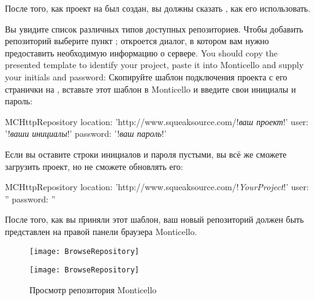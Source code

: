 \documentclass[a4paper,10pt,twoside]{book}
\begin{document}
{%
После того, как проект на \sqsrc был создан, вы должны сказать \pharo, как его использовать.

 Вы увидите список различных типов доступных репозиториев. Чтобы добавить репозиторий \sqsrc выберите пункт ; откроется диалог, в котором вам нужно предоставить необходимую информацию о сервере.
You should copy the presented template to identify your \sqsrc project, paste it into Monticello and supply your initials and password:
Скопируйте шаблон подключения проекта с его странички на \sqsrc, вставьте этот шаблон в Monticello и введите свои инициалы и пароль:

\begin{code}{}
MCHttpRepository 
    location: 'http://www.squeaksource.com/!\emph{ваш проект}!'
    user: '!\emph{ваши инициалы}!' 
    password: '!\emph{ваш пароль}!'
\end{code}   

\noindent
Если вы оставите строки инициалов и пароля пустыми, вы всё же сможете загрузить проект, но не сможете обновлять его:

\begin{code}{}
MCHttpRepository 
    location: 'http://www.squeaksource.com/!\emph{YourProject}!'
    user: '' 
    password: ''
\end{code}   

После того, как вы приняли этот шаблон, ваш новый репозиторий должен быть представлен на правой панели браузера Monticello.

\begin{figure}[hbt]
\ifluluelse
	{\centerline {\texttt{[image: BrowseRepository]}}}
	{\centerline {\texttt{[image: BrowseRepository]}}}
\caption{Просмотр репозитория Monticello
}
\end{figure}

}
\end{document}
